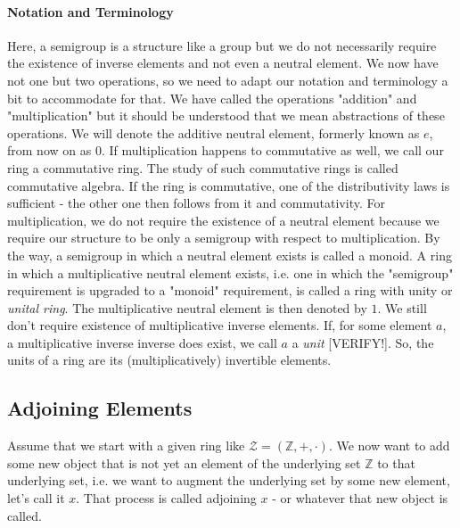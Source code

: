 \paragraph{Notation and Terminology}
Here, a semigroup is a structure like a group but we do not necessarily require the existence of inverse elements and not even a neutral element. We now have not one but two operations, so we need to adapt our notation and terminology a bit to accommodate for that. We have called the operations "addition" and "multiplication" but it should be understood that we mean abstractions of these operations. We will denote the additive neutral element, formerly known as $e$, from now on as $0$.  If multiplication happens to commutative as well, we call our ring a commutative ring. The study of such commutative rings is called commutative algebra. If the ring is commutative, one of the distributivity laws is sufficient - the other one then follows from it and commutativity. For multiplication, we do not require the existence of a neutral element because we require our structure to be only a semigroup with respect to multiplication. By the way, a semigroup in which a neutral element exists is called a monoid. A ring in which a multiplicative neutral element exists, i.e. one in which the "semigroup" requirement is upgraded to a "monoid" requirement, is called a ring with unity or \emph{unital ring}. The multiplicative neutral element is then denoted by $1$. We still don't require existence of multiplicative inverse elements. If, for some element $a$, a multiplicative inverse inverse does exist, we call $a$ a \emph{unit} [VERIFY!]. So, the units of a ring are its (multiplicatively) invertible elements.





\subsection{Adjoining Elements}
Assume that we start with a given ring like $\mathcal{Z} = (\mathbb{Z},+,\cdot)$. We now want to add some new object that is not yet an element of the underlying set $\mathbb{Z}$ to that underlying set, i.e. we want to augment the underlying set by some new element, let's call it $x$. That process is called adjoining $x$ - or whatever that new object is called. 

